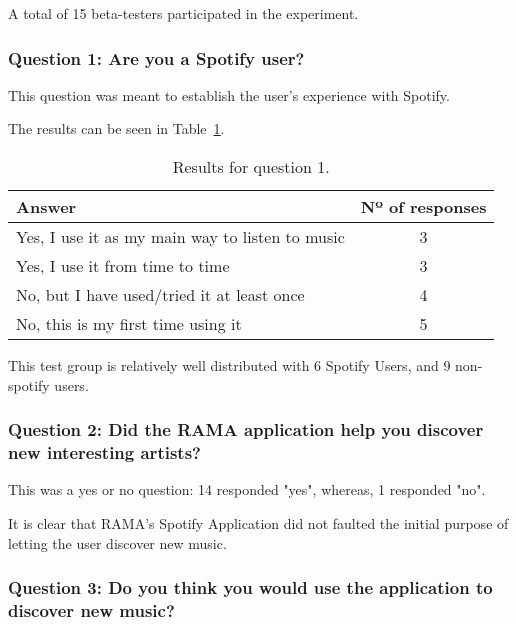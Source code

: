     A total of 15 beta-testers participated in the experiment.

    \subsubsection{Question 1: Are you a Spotify user?} %
    \label{ssub:question_1}

      This question was meant to establish the user's experience with Spotify.

      The results can be seen in Table~\ref{tab:question1}.

      \begin{table}[hb]
         \begin{center}
           \begin{tabular}{l|c}
       
           \hline
           \textbf{Answer} & \textbf{Nº of responses} \\
           \hline

           \hline
              Yes, I use it as my main way to listen to music & 3 \\
              Yes, I use it from time to time & 3 \\
              No, but I have used/tried it at least once & 4 \\
              No, this is my first time using it & 5 \\
           \hline
           \end{tabular}
         \end{center}
         \caption{Results for question 1.}
         \label{tab:question1}
       \end{table}

       This test group is relatively well distributed with 6 Spotify Users, and 9 non-spotify users.
    
    \subsubsection{Question 2: Did the RAMA application help you discover new interesting artists?}
    \label{ssub:question_2}

      This was a yes or no question: 14 responded "yes", whereas, 1 responded "no".

      It is clear that RAMA's Spotify Application did not faulted the initial purpose of letting the user discover new music.


    \subsubsection{Question 3: Do you think you would use the application to discover new music?}
    \label{ssub:question_3}

